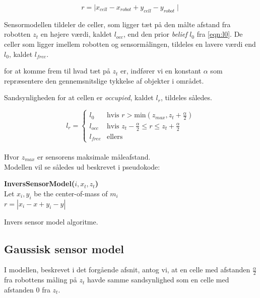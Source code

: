\begin{equation}
r = \mid x_{cell} - x_{robot} + y_{cell} - y_{robot} \mid
\end{equation}

Sensormodellen tildeler de celler, som ligger tæt på den målte afstand fra robotten $z_t$ en højere værdi, kaldet $l_{occ}$, end den prior \textit{belief} $l_0$ fra \cref{eqn:l0}.
De celler som ligger imellem robotten og sensormålingen, tildeles en lavere værdi end $l_0$, kaldet $l_{free}$. 

for at komme frem til hvad tæt på $z_t$ er, indfører vi en konstant $\alpha$ som repræsentere den gennemsnitslige tykkelse af objekter i området.

Sandsynligheden for at cellen er \emph{occupied}, kaldet $l_r$, tildeles således.

\begin{equation}
l_{r} = \begin{cases} 
	l_0 &\text{hvis }r > \text{min}(z_{max},z_t+\frac{\alpha}{2}) \\ 
	l_{occ} &\text{hvis } z_t-\frac{\alpha}{2} \leq r \leq z_t+\frac{\alpha}{2}\\ 
	l_{free} &\text{ellers}  
\end{cases}
\end{equation} \\
Hvor $z_{max}$ er sensorens maksimale måleafstand.
\\
Modellen vil se således ud beskrevet i pseudokode:

\begin{algorithm}[H]
\textbf{InversSensorModel($i, x_t, z_t$)} \\
Let $x_i,y_i$ be the center-of-mass of $m_i$ \\
$r = |x_i - x + y_i - y|$ \\
\caption{Invers sensor model algoritme.}
\label{alg:inversesensormodel}
\end{algorithm}

\subsection{Gaussisk sensor model}

I modellen, beskrevet i det forgående afsnit, antog vi, at en celle
med afstanden $\frac{\alpha}{2}$ fra robottens måling på $z_t$ havde
samme sandsynlighed som en celle med afstanden 0 fra $z_t$.


